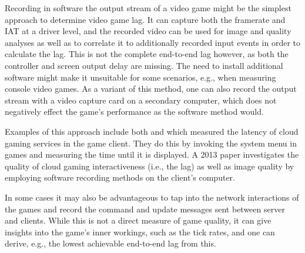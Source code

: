 
Recording in software the output stream of a video game might be the simplest approach to determine video game lag. It can capture both the framerate and \gls{IAT} at a driver level, and the recorded video can be used for image and quality analyses as well as to correlate it to additionally recorded input events in order to calculate the lag. This is not the complete end-to-end lag however, as both the controller and screen output delay are missing. The need to install additional software might make it unsuitable for some scenarios, e.g., when measuring console video games. As a variant of this method, one can also record the output stream with a video capture card on a secondary computer, which does not negatively effect the game's performance as the software method would.

Examples of this approach include both \cite{Chen:2011:MLC:2072298.2071991} and \cite{6670099} which measured the latency of cloud gaming services in the game client. They do this by invoking the system menu in games and measuring the time until it is displayed. A 2013 paper \cite{6574660} investigates the quality of cloud gaming interactiveness (i.e., the lag) as well as image quality by employing software recording methods on the client's computer.

In some cases it may also be advantageous to tap into the network interactions of the games and record the command and update messages sent between server and clients. While this is not a direct measure of game quality, it can give insights into the game's inner workings, such as the tick rates, and one can derive, e.g., the lowest achievable end-to-end lag from this.


